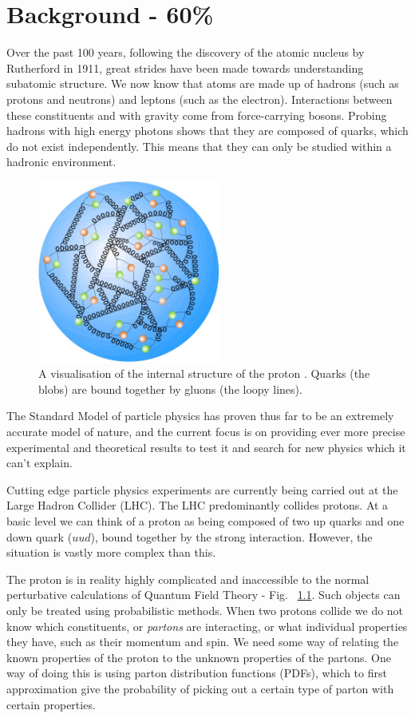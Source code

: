 \chapter{Background - 60\%}
Over the past 100 years, following the discovery of the atomic nucleus by Rutherford in 1911, great
strides have been made towards understanding subatomic structure. We now know that atoms are made up of hadrons (such as protons and neutrons) and leptons
(such as the electron). Interactions between these constituents and with gravity come from
force-carrying bosons. Probing hadrons with high energy photons shows that
they are composed of quarks, which do not exist independently. This means that they can only be
studied within a hadronic environment. 

\begin{figure}     
          \includegraphics[width=6cm]{background/proton_cartoon.jpg}
        \caption{A visualisation of the internal structure of the proton \cite{desy}. Quarks (the blobs) are bound together
          by gluons (the loopy lines).}
\label{fig:proton}                 
\end{figure}

The Standard Model of particle physics has proven thus
far to be an extremely accurate  model of nature, and the current focus is on providing ever more precise
experimental and theoretical results to test it and search for new physics which it can't explain.

Cutting edge particle physics experiments are currently being carried out at the Large Hadron Collider
(LHC). The LHC predominantly collides protons. At a basic level we can think of
a proton as being composed of two up quarks and one down quark ($uud$), bound together by the strong
interaction. However, the situation is vastly more complex than this.


The proton is in reality
highly complicated and inaccessible to the normal perturbative calculations of Quantum Field Theory
- Fig. ~\ref{fig:proton}.
Such objects can only be treated using probabilistic methods. When two protons collide we do not know which constituents,
or {\it partons} are interacting, or what individual properties they have, such as their momentum and spin. We need
some way of relating the known properties of the proton to the unknown properties of the partons.
One way of doing this is using parton distribution functions (PDFs), which to first approximation give the
probability of picking out a certain type of parton with certain properties.

